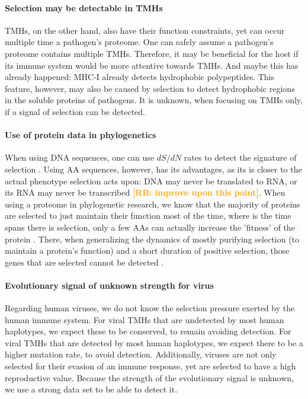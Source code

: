 \documentclass{article}
\newcommand{\richel}[1]{\textcolor{orange}{\textbf{[RB: #1]}}}
\begin{document}
\paragraph{Selection may be detectable in TMHs}

TMHs, on the other hand, also have their function constraints, 
yet can occur multiple time a pathogen's proteome.
One can safely assume a pathogen's proteome contains multiple TMHs.
Therefore, it may be beneficial for the host
if its immune system would be more attentive towards TMHs.
And maybe this has already happened: MHC-I already detects hydrophobic
polypeptides. This feature, however, may also be caused by selection
to detect hydrophobic regions in the soluble proteins of pathogens.
It is unknown, when focusing on TMHs only, if a signal of selection
can be detected.

\paragraph{Use of protein data in phylogenetics}

When using DNA sequences, one can use $dS/dN$ rates 
to detect the signature of selection \cite{murrell2015gene}.
Using AA sequences, however, has its advantages,
as its is closer to the actual phenotype
selection acts upon: DNA may never be translated to RNA,
or its RNA may never be transcribed \cite{diz2012proteomics}
\richel{improve upon this point}.
When using a proteome in phylogenetic research,
we know that the majority of proteins are selected to just 
maintain their function most of the time, where
is the time spans there is selection, only a few AAs
can actually increase the 'fitness' of the 
protein \cite{anisimova2009investigating}.
There, when generalizing the dynamics of mostly purifying selection (to maintain
a protein's function) and a short duration of positive selection,
those genes that are selected cannot be detected \cite{yang2000statistical}.

\paragraph{Evolutionary signal of unknown strength for virus}


Regarding human viruses, we do not know the selection pressure
exerted by the human immune system.
For viral TMHs that are undetected by most human haplotypes, we
expect these to be conserved, to remain avoiding detection.
For viral TMHs that are detected by most human haplotypes, we
expect there to be a higher mutation rate, to avoid detection.
Additionally, viruses are not only selected for their evasion of an 
immune response, yet are selected to have a high reproductive value.
Because the strength of the evolutionary signal is unknown,
we use a strong data set to be able to detect it.
\end{document}

